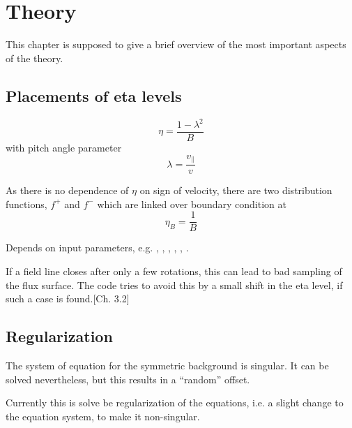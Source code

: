 \chapter{Theory}
This chapter is supposed to give a brief overview of the most important
aspects of the theory.

\section{Placements of eta levels}

\begin{equation}
  \eta = \frac{1 - \lambda^2}{B}
\end{equation}
with pitch angle parameter
\begin{equation}
  \lambda = \frac{v_{\parallel}}{v}
\end{equation}

As there is no dependence of $\eta$ on sign of velocity, there are two
distribution functions, $f^{+}$ and $f^{-}$ which are linked over
boundary condition at
\begin{equation}
  \eta_B = \frac{1}{B}
\end{equation}

Depends on input parameters, e.g. ,
,
,
,
,
.

If a field line closes after only a few rotations, this can lead to bad
sampling of the flux surface. The code tries to avoid this by a small
shift in the eta level, if such a case is found.\cite{Kapper:Diss:17}[Ch. 3.2]

\section{Regularization}
The system of equation for the symmetric background is singular. It
can be solved nevertheless, but this results in a ``random'' offset.

Currently this is solve be regularization of the equations, i.e. a
slight change to the equation system, to make it non-singular.

